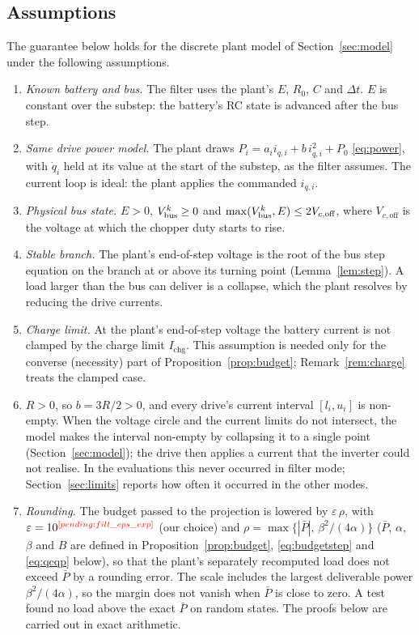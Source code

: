 \subsection{Assumptions}
The guarantee below holds for the discrete plant model of Section~\ref{sec:model} under the following assumptions.
\begin{enumerate}
\item[(A1)] \emph{Known battery and bus.} The filter uses the plant's $E$, $R_0$, $C$ and $\Delta t$. $E$ is constant over the substep: the battery's RC state is advanced after the bus step.
\item[(A2)] \emph{Same drive power model.} The plant draws $P_i = a_i i_{q,i} + b\,i_{q,i}^2 + P_0$ \eqref{eq:power}, with $\dot q_i$ held at its value at the start of the substep, as the filter assumes. The current loop is ideal: the plant applies the commanded $i_{q,i}$.
\item[(A3)] \emph{Physical bus state.} $E>0$, $V_{\mathrm{bus}}^k \ge 0$ and $\max(V_{\mathrm{bus}}^k, E) \le 2V_{c,\mathrm{off}}$, where $V_{c,\mathrm{off}}$ is the voltage at which the chopper duty starts to rise.
\item[(A4)] \emph{Stable branch.} The plant's end-of-step voltage is the root of the bus step equation on the branch at or above its turning point (Lemma~\ref{lem:step}). A load larger than the bus can deliver is a collapse, which the plant resolves by reducing the drive currents.
\item[(A5)] \emph{Charge limit.} At the plant's end-of-step voltage the battery current is not clamped by the charge limit $I_{\mathrm{chg}}$. This assumption is needed only for the converse (necessity) part of Proposition~\ref{prop:budget}; Remark~\ref{rem:charge} treats the clamped case.
\item[(A6)] $R>0$, so $b=3R/2>0$, and every drive's current interval $[l_i,u_i]$ is non-empty. When the voltage circle and the current limits do not intersect, the model makes the interval non-empty by collapsing it to a single point (Section~\ref{sec:model}); the drive then applies a current that the inverter could not realise. In the evaluations this never occurred in filter mode; Section~\ref{sec:limits} reports how often it occurred in the other modes.
\item[(A7)] \emph{Rounding.} The budget passed to the projection is lowered by $\varepsilon\,\rho$, with $\varepsilon=10^{\res{filt_eps_exp}}$ (our choice) and $\rho=\max\{|\bar P|,\,\beta^2/(4\alpha)\}$ ($\bar P$, $\alpha$, $\beta$ and $B$ are defined in Proposition~\ref{prop:budget}, \eqref{eq:budgetstep} and \eqref{eq:qcqp} below), so that the plant's separately recomputed load does not exceed $\bar P$ by a rounding error. The scale includes the largest deliverable power $\beta^2/(4\alpha)$, so the margin does not vanish when $\bar P$ is close to zero. A test found no load above the exact $\bar P$ on  random states. The proofs below are carried out in exact arithmetic.
\end{enumerate}

